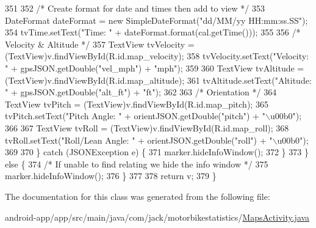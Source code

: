 \begin{DoxyCode}
351 
352                     \textcolor{comment}{/* Create format for date and times then add to view */}
353                     DateFormat dateFormat = \textcolor{keyword}{new} SimpleDateFormat(\textcolor{stringliteral}{"dd/MM/yy HH:mm:ss.SS"});
354                     tvTime.setText(\textcolor{stringliteral}{"Time: "} + dateFormat.format(cal.getTime()));
355 
356                     \textcolor{comment}{/* Velocity & Altitude */}
357                     TextView tvVelocity = (TextView)v.findViewById(R.id.map\_velocity);
358                     tvVelocity.setText(\textcolor{stringliteral}{"Velocity: "} + gpsJSON.getDouble(\textcolor{stringliteral}{"vel\_mph"}) + \textcolor{stringliteral}{"mph"});
359 
360                     TextView tvAltitude = (TextView)v.findViewById(R.id.map\_altitude);
361                     tvAltitude.setText(\textcolor{stringliteral}{"Altitude: "} + gpsJSON.getDouble(\textcolor{stringliteral}{"alt\_ft"}) + \textcolor{stringliteral}{"ft"});
362 
363                     \textcolor{comment}{/* Orientation */}
364                     TextView tvPitch = (TextView)v.findViewById(R.id.map\_pitch);
365                     tvPitch.setText(\textcolor{stringliteral}{"Pitch Angle: "} + orientJSON.getDouble(\textcolor{stringliteral}{"pitch"}) + \textcolor{stringliteral}{"\(\backslash\)u00b0"});
366 
367                     TextView tvRoll = (TextView)v.findViewById(R.id.map\_roll);
368                     tvRoll.setText(\textcolor{stringliteral}{"Roll/Lean Angle: "} + orientJSON.getDouble(\textcolor{stringliteral}{"roll"}) + \textcolor{stringliteral}{"\(\backslash\)u00b0"});
369 
370                 \} \textcolor{keywordflow}{catch} (JSONException e) \{
371                     marker.hideInfoWindow();
372                 \}
373             \} \textcolor{keywordflow}{else} \{
374                 \textcolor{comment}{/* If unable to find relating we hide the info window */}
375                 marker.hideInfoWindow();
376             \}
377 
378             \textcolor{keywordflow}{return} v;
379         \}
\end{DoxyCode}


The documentation for this class was generated from the following file\+:\begin{DoxyCompactItemize}
\item 
android-\/app/app/src/main/java/com/jack/motorbikestatistics/\hyperlink{_maps_activity_8java}{Maps\+Activity.\+java}\end{DoxyCompactItemize}
